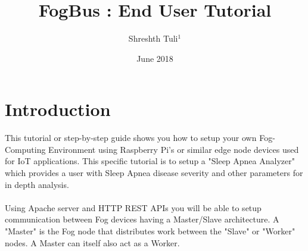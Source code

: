 \documentclass{article}
\title{FogBus : End User Tutorial}
\author{Shreshth Tuli$^{1}$}
\date{June 2018}
\begin{document}
\maketitle

\section{Introduction}
This tutorial or step-by-step guide shows you how to setup your own Fog-Computing Environment using Raspberry Pi's or similar edge node devices used for IoT applications. This specific tutorial is to setup a "Sleep Apnea Analyzer" which provides a user with Sleep Apnea disease severity and other parameters for in depth analysis.\\ \\
Using Apache server and HTTP REST APIs you will be able to setup communication between Fog devices having a Master/Slave architecture. A "Master" is the Fog node that distributes work between the "Slave" or "Worker" nodes. A Master can itself also act as a Worker. 
\end{document}
